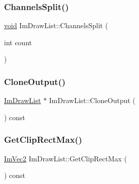 \mbox{\label{structImDrawList_acd7bcb6c4c5043876cfc169a98abc24a}} 
\subsubsection{\texorpdfstring{Channels\+Split()}{ChannelsSplit()}}
{\footnotesize\ttfamily \hyperlink{imgui__impl__opengl3__loader_8h_ac668e7cffd9e2e9cfee428b9b2f34fa7}{void} Im\+Draw\+List\+::\+Channels\+Split (\begin{DoxyParamCaption}\item[{int}]{count }\end{DoxyParamCaption})\hspace{0.3cm}{\ttfamily [inline]}}

\mbox{\label{structImDrawList_a24c853c3976c77e7b361fab39adde686}} 
\subsubsection{\texorpdfstring{Clone\+Output()}{CloneOutput()}}
{\footnotesize\ttfamily \hyperlink{structImDrawList}{Im\+Draw\+List} $\ast$ Im\+Draw\+List\+::\+Clone\+Output (\begin{DoxyParamCaption}{ }\end{DoxyParamCaption}) const}

\mbox{\label{structImDrawList_a8e484a61eab501c1c1c416a8b45bb08e}} 
\subsubsection{\texorpdfstring{Get\+Clip\+Rect\+Max()}{GetClipRectMax()}}
{\footnotesize\ttfamily \hyperlink{structImVec2}{Im\+Vec2} Im\+Draw\+List\+::\+Get\+Clip\+Rect\+Max (\begin{DoxyParamCaption}{ }\end{DoxyParamCaption}) const\hspace{0.3cm}{\ttfamily [inline]}}

